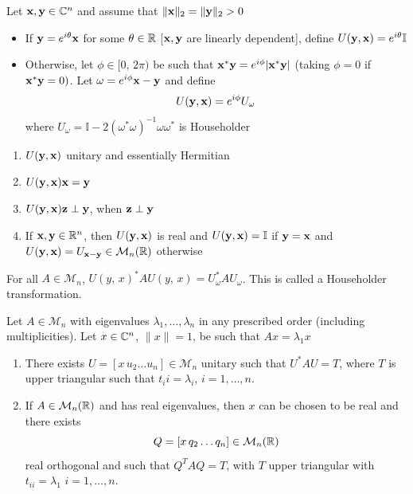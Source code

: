 \documentclass[aspectratio=169]{beamer}
\begin{document}
\begin{frame}
\begin{theorem}
 Let $\mathbf{x},\mathbf{y}\in \mathbb{C}^n$ and assume that $\|\mathbf{x}\|_2= \|\mathbf{y}\|_2> 0$ 
 \begin{itemize}
     \item  If $\mathbf{y}=e^{i \theta}\mathbf{x}$ for some $\theta\in \mathbb{R}$ [$\mathbf{x},\mathbf{y}$ are linearly dependent], define $U(\mathbf{y},\mathbf{x})= e^{i\theta}\mathbb{I}$
     \item Otherwise, let $\phi\in [0,\, 2\pi)$ be such that $\mathbf{x}^*\mathbf{y}= e^{i\phi} |\mathbf{x}^{*}\mathbf{y}|$ (taking $\phi=0$ if $\mathbf{x}^*\mathbf{y}=0)$. Let $\omega= e^{i\phi}\mathbf{x}-\mathbf{y}$ and define 
     \[
        U(\mathbf{y},\mathbf{x})= e^{i\phi}U_{\omega}
    \]
     where $U_{\omega}= \mathbb{I}-2(\omega^* \omega)^{-1} \omega \omega^*$ is Householder
\end{itemize}
\begin{enumerate}
    \item $U(\mathbf{y},\mathbf{x})$ unitary and essentially Hermitian
    \item $U(\mathbf{y},\mathbf{x})\mathbf{x}=\mathbf{y}$
    \item $U(\mathbf{y},\mathbf{x})\mathbf{z} \perp\mathbf{y}$, when $\mathbf{z}\perp\mathbf{y}$
    \item If $\mathbf{x},\mathbf{y}\in \mathbb{R}^n$, then $U(\mathbf{y},\mathbf{x})$ is real and $U(\mathbf{y},\mathbf{x})= \mathbb{I}$ if $\mathbf{y}=\mathbf{x}$ and $U(\mathbf{y},\mathbf{x})=U_{\mathbf{x}-\mathbf{y}}\in \mathcal{M}_n(\mathbb{R})$ otherwise
\end{enumerate}
\end{theorem}
\end{frame}



\begin{frame}
\begin{remark}
For all $A\in \mathcal{M}_n$, $U(y,\,x)^*AU(y,\,x)= U_{\omega}^*AU_{\omega}$. This is called a Householder transformation.
\end{remark}
\vfill
\begin{theorem}
Let $A\in \mathcal{M}_n$ with eigenvalues $\lambda_1,\ldots, \lambda_n$ in any prescribed order (including multiplicities). Let $x\in \mathbb{C}^n$, $\| x\|=1$, be such that $Ax= \lambda_1 x $
\begin{enumerate}
    \item There exists $U=[ x \, u_2 \ldots u_n]\in \mathcal{M}_n$ unitary such that $U^{*} AU= T$, where $T$ is upper triangular such that $t_ii= \lambda_i$, $i= 1, \ldots,n$. 
    \item If $A\in \mathcal{M}_n(\mathbb{R})$ and has real eigenvalues, then $x$ can be chosen to be real and there exists 
    \[Q=[ x \, q_2 \ldots q_n]\in \mathcal{M}_n(\mathbb{R})\]
    real orthogonal and such that $Q^TAQ=T$, with $T$ upper triangular with $t_{ii}=\lambda_1$ $i= 1, \ldots, n$. 
\end{enumerate}
\end{theorem}
\end{frame}
\end{document}
